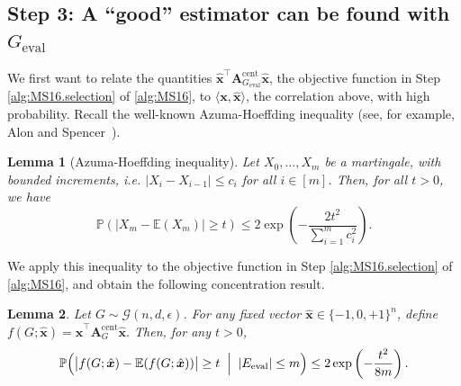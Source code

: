 \documentclass[11pt, titlepage]{article} %
\numberwithin{equation}{section}
\newtheorem{lemma}{Lemma}
\theoremstyle{definition}
\numberwithin{theorem}{section}
\numberwithin{lemma}{section}
\numberwithin{corollary}{section}
\numberwithin{proposition}{section}
\numberwithin{definition}{section}
\numberwithin{remark}{section}
\begin{document}
\subsection{Step 3: A ``good'' estimator can be found with $G_\mathrm{eval}$}
We first want to relate the quantities $\hat{\bm{x}}^\top \bm{A}_{G_\mathrm{eval}}^\mathrm{cent} \hat{\bm{x}}$,
the objective function in Step \ref{alg:MS16.selection} of \cref{alg:MS16},
to $\langle\bm{x}, \hat{\bm{x}}\rangle$, the correlation above, with high probability. 
Recall the well-known Azuma-Hoeffding inequality (see, for example, Alon and Spencer~\cite[Chapter 7]{Alon16}).
\begin{lemma}[Azuma-Hoeffding inequality]
\label{lem:A-H}
Let $X_0, \ldots, X_m$ be a martingale, with bounded increments,
i.e. $|X_i - X_{i-1}| \leq c_i$ for all $i \in [m]$. Then, for all $t > 0$, we have
\[
\mathbb{P}(|X_m - \mathbb{E}(X_m)| \geq t) \leq 2\exp\left(-\frac{2t^2}{\sum_{i=1}^{m} c_i^2}\right).
\]
\end{lemma}
We apply this inequality to the objective function in Step \ref{alg:MS16.selection} of \cref{alg:MS16}, 
and obtain the following concentration result.
\begin{lemma}
\label{lem:conc}
Let $G \sim \mathcal{G}(n, d, \epsilon)$. For any fixed vector $\hat{\bm{x}} \in \{-1, 0, +1\}^n$, 
define $f(G; \hat{\bm{x}}) = \hat{\bm{x}}^\top \bm{A}_{G}^{\mathrm{cent}} \hat{\bm{x}}.$
Then, for any $t > 0$,
\[
\mathbb{P}\Bigl(
    \bigl|f(G; \hat{\bm{x}})-\mathbb{E}(f(G; \hat{\bm{x}}))\bigr|
    \ge t
    \;\Bigm|\;
    |E_{\mathrm{eval}}| \le m
\Bigr) \leq 2 \exp\left(-\frac{t^2}{8m}\right).
\]
\end{lemma}
\end{document}
